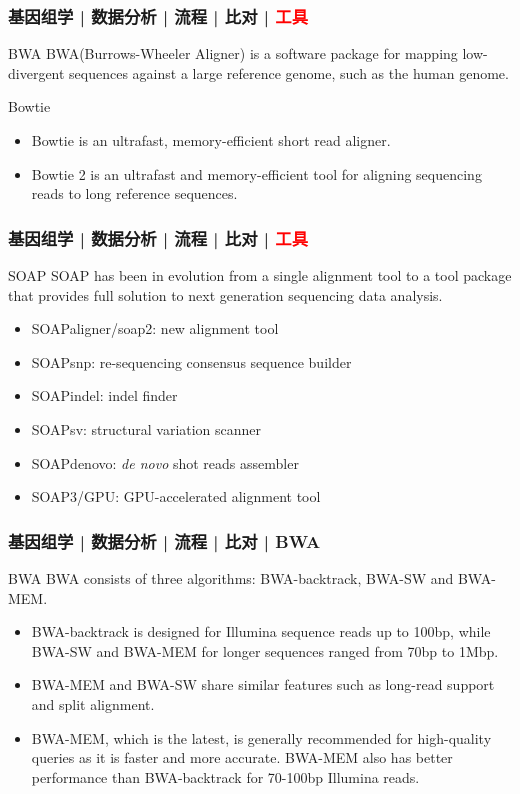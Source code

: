\begin{frame}
  \frametitle{基因组学 | 数据分析 | 流程 | 比对 | \textcolor{red}{工具}}
  \begin{block}{BWA}
    BWA(Burrows-Wheeler Aligner) is a software package for mapping low-divergent sequences against a large reference genome, such as the human genome.
  \end{block}
  \pause
  \begin{block}{Bowtie}
    \begin{itemize}
      \item Bowtie is an ultrafast, memory-efficient short read aligner.
      \item Bowtie 2 is an ultrafast and memory-efficient tool for aligning sequencing reads to long reference sequences.
    \end{itemize}
  \end{block}
\end{frame}


\begin{frame}
  \frametitle{基因组学 | 数据分析 | 流程 | 比对 | \textcolor{red}{工具}}
  \begin{block}{SOAP}
    SOAP has been in evolution from a single alignment tool to a tool package that provides full solution to next generation sequencing data analysis.
    \begin{itemize}
      \item SOAPaligner/soap2: new alignment tool
      \item SOAPsnp: re-sequencing consensus sequence builder 
      \item SOAPindel: indel finder 
      \item SOAPsv: structural variation scanner
      \item SOAPdenovo: \textit{de novo} shot reads assembler
      \item SOAP3/GPU: GPU-accelerated alignment tool
    \end{itemize}
  \end{block}
\end{frame}

\begin{frame}
  \frametitle{基因组学 | 数据分析 | 流程 | 比对 | BWA}
  \begin{block}{BWA}
     BWA consists of three algorithms: BWA-backtrack, BWA-SW and BWA-MEM.
    \begin{itemize}
      \item BWA-backtrack is designed for Illumina sequence reads up to 100bp, while BWA-SW and BWA-MEM for longer sequences ranged from 70bp to 1Mbp.
      \item BWA-MEM and BWA-SW share similar features such as long-read support and split alignment.
      \item BWA-MEM, which is the latest, is generally recommended for high-quality queries as it is faster and more accurate. BWA-MEM also has better performance than BWA-backtrack for 70-100bp Illumina reads. 
    \end{itemize}
  \end{block}
\end{frame}

